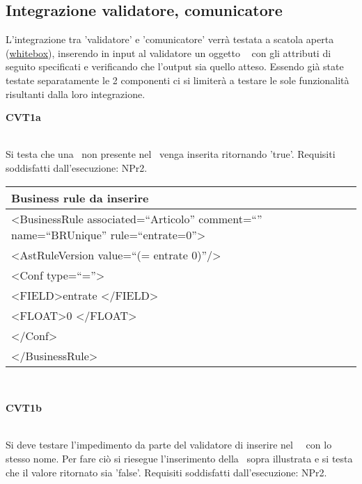 \subsection{Integrazione validatore, comunicatore}
L'integrazione tra 'validatore' e 'comunicatore' verr\`a testata a scatola aperta (\underline{whitebox}), inserendo in input al validatore un oggetto \textit{\br\ } con gli attributi di seguito specificati e verificando che l'output sia quello atteso. Essendo gi\`a state testate separatamente le 2 componenti ci si limiter\`a a testare le sole funzionalit\`a risultanti dalla loro integrazione.\\

\begin{Large}\textbf{CVT1a}\end{Large} \\
Si testa che una \br\ non presente nel \rp\ venga inserita ritornando 'true'.
Requisiti soddisfatti dall'esecuzione: NPr2. \\
\begin{center}
\begin{tabular}{|p{11cm}|} \hline
\textbf{Business rule da inserire}\\ \hline
\textless BusinessRule associated=``Articolo'' comment=``'' name=``BRUnique'' rule=``entrate=0''\textgreater \\
\textless AstRuleVersion value=``(= entrate 0)''/\textgreater \\
 \textless Conf type=``=''\textgreater \\
 \textless FIELD\textgreater entrate \textless /FIELD\textgreater \\
 \textless FLOAT\textgreater 0 \textless /FLOAT\textgreater \\
 \textless /Conf\textgreater \\
\textless /BusinessRule\textgreater \\ \hline
\end{tabular} \\
\end{center}

\begin{Large}\textbf{CVT1b}\end{Large} \\
Si deve testare l'impedimento da parte del validatore di inserire nel \rp\ \br\ con lo stesso nome. Per fare ci\`o si riesegue l'inserimento della \br\ sopra illustrata e si testa che il valore ritornato sia 'false'.
Requisiti soddisfatti dall'esecuzione: NPr2.\\
 \\
